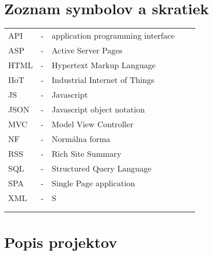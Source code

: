 \documentclass[11pt, oneside]{report}
\begin{document}
\chapter*{ Zoznam symbolov a skratiek }
\begin{table}[H]
\label{my-label}
\begin{tabular}{lllll}
API  & - &  application programming interface &  &  \\
ASP&- &Active Server Pages  &  &  \\
HTML & - &  Hypertext Markup Language&  &  \\
IIoT & - &  Industrial Internet of Things  &  &  \\
JS   & - & Javascript  &  &  \\
JSON & - & Javascript object notation &  &  \\
MVC  & - &  Model View Controller &  &  \\
NF & - &  Normálna forma &  &  \\
RSS & - &  Rich Site Summary &  &  \\
SQL  & - &  Structured Query Language&  &  \\
SPA  & - &  Single Page application&  &  \\
XML  & - &  S&  &  \\
 &  &  &  &  \\
 &  &  &  & 
\end{tabular}
\end{table}
\newpage 

\listoffigures

\newpage 

\listoftables
{}




 



\chapter{Popis projektov}
\end{document}
